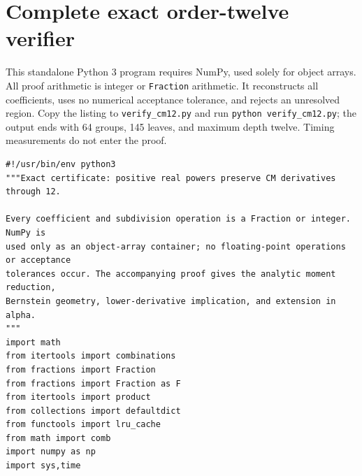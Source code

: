 \documentclass[11pt]{article}
\begin{document}
\appendix
\section{Complete exact order-twelve verifier}\label{app:code}
This standalone Python 3 program requires NumPy, used solely for object arrays.
All proof arithmetic is integer or \texttt{Fraction} arithmetic. It reconstructs
all coefficients, uses no numerical acceptance tolerance, and rejects an
unresolved region. Copy the listing to \texttt{verify\_cm12.py} and run
\texttt{python verify\_cm12.py}; the output ends with 64 groups, 145 leaves,
and maximum depth twelve. Timing measurements do not enter the proof.
\begin{lstlisting}
#!/usr/bin/env python3
"""Exact certificate: positive real powers preserve CM derivatives through 12.

Every coefficient and subdivision operation is a Fraction or integer. NumPy is
used only as an object-array container; no floating-point operations or acceptance
tolerances occur. The accompanying proof gives the analytic moment reduction,
Bernstein geometry, lower-derivative implication, and extension in alpha.
"""
import math
from itertools import combinations
from fractions import Fraction
from fractions import Fraction as F
from itertools import product
from collections import defaultdict
from functools import lru_cache
from math import comb
import numpy as np
import sys,time


\end{lstlisting}
\end{document}
